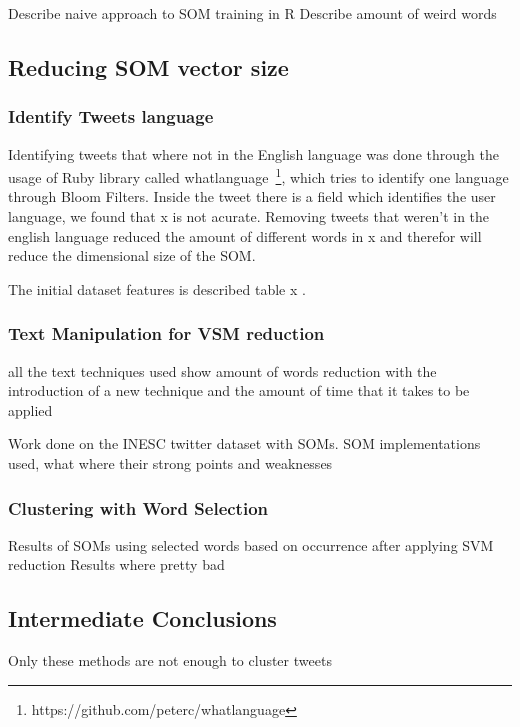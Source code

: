 {\color{red} Describe naive approach to SOM training in R }
{\color{red} Describe amount of weird words }

\subsection{Reducing SOM vector size}
\label{sub:reducing_som_vector_size}

\subsubsection{Identify Tweets language}
\label{ssub:identify_tweets_lang}

Identifying tweets that where not in the English language was done through the usage of Ruby library called whatlanguage~\footnote{https://github.com/peterc/whatlanguage}, which tries to identify one language through Bloom Filters. Inside the tweet there is a field which identifies the user language, we found that x is not acurate. Removing tweets that weren't in the english language reduced the amount of different words in x and therefor will reduce the dimensional size of the \ac{SOM}.

{\color{red}  The initial dataset features is described table x}
 .
\subsubsection{Text Manipulation for VSM reduction}
\label{ssub:Text Manipulation for SVM reduction}
{\color{red} all the text techniques used }
{\color{red} show amount of words reduction with the introduction of a new technique and the amount of time that it takes to be applied }

Work done on the INESC twitter dataset with SOMs.
SOM implementations used, what where their strong points and weaknesses

\subsubsection{Clustering with Word Selection }
\label{ssub:Word Selection for Clustering}
{\color{red} Results of SOMs using selected words based on occurrence after applying SVM reduction }
{\color{red} Results where pretty bad }

\subsection{Intermediate Conclusions}
\label{sub:intermediate_conclusions}
{\color{red} Only these methods are not enough to cluster tweets }

